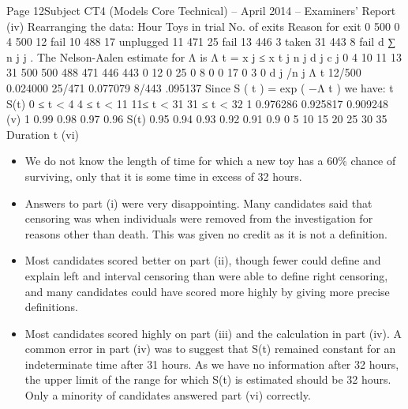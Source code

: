 \documentclass[a4paper,12pt]{article}
\begin{document}
Page 12Subject CT4 (Models Core Technical) – April 2014 – Examiners’ Report
(iv)
Rearranging the data:
Hour
Toys in trial
No. of exits
Reason for exit
0
500
0
4
500
12
fail
10
488
17
unplugged
11
471
25
fail
13
446
3
taken
31
443
8
fail
d
∑ n j j .
The Nelson-Aalen estimate for Λ is Λ t =
x j ≤ x
t j n j d j c j
0
4
10
11
13
31 500
500
488
471
446
443 0
12
0
25
0
8 0
0
17
0
3
0
d j /n j Λ t
12/500 0.024000
25/471 0.077079
8/443 .095137
Since S ( t ) = exp ( −Λ t ) we have:
t S(t)
0 ≤ t < 4
4 ≤ t < 11
11≤ t < 31
31 ≤ t < 32 1
0.976286
0.925817
0.909248
(v)
1
0.99
0.98
0.97
0.96
S(t) 0.95
0.94
0.93
0.92
0.91
0.9
0
5
10
15
20
25
30
35
Duration t
(vi)
\begin{itemize}
\item We do not know the length of time for which a new toy has a 60\% chance of
surviving, only that it is some time in excess of 32 hours.
\item Answers to part (i) were very disappointing. Many candidates said that censoring was when
individuals were removed from the investigation for reasons other than death. This was
given no credit as it is not a definition. 
\item Most candidates scored better on part (ii), though
fewer could define and explain left and interval censoring than were able to define right
censoring, and many candidates could have scored more highly by giving more precise
definitions. 
\item Most candidates scored highly on part (iii) and the calculation in part (iv). A
common error in part (iv) was to suggest that S(t) remained constant for an indeterminate
time after 31 hours. As we have no information after 32 hours, the upper limit of the range
for which S(t) is estimated should be 32 hours. Only a minority of candidates answered part
(vi) correctly.
\end{itemize}
\end{document}
